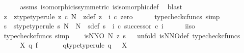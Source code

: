 \begin{isabellebody}
\ \ \ \ \isamarkupfalse%
\ assms\ isomorphic{\isacharunderscore}{\kern0pt}is{\isacharunderscore}{\kern0pt}symmetric\ is{\isacharunderscore}{\kern0pt}isomorphic{\isacharunderscore}{\kern0pt}def\ \isamarkupfalse%
\ blast\ \isanewline
\ \ \isamarkupfalse%
\ z\ \ z{\isacharunderscore}{\kern0pt}type{\isacharbrackleft}{\kern0pt}type{\isacharunderscore}{\kern0pt}rule{\isacharbrackright}{\kern0pt}{\isacharcolon}{\kern0pt}\ {\isachardoublequoteopen}z\ {\isasymin}\isactrlsub c\ N{\isachardoublequoteclose}\ \ z{\isacharunderscore}{\kern0pt}def{\isacharcolon}{\kern0pt}\ {\isachardoublequoteopen}z\ {\isacharequal}{\kern0pt}\ i\ {\isasymcirc}\isactrlsub c\ zero{\isachardoublequoteclose}\isanewline
\ \ \ \ \isamarkupfalse%
\ {\isacharparenleft}{\kern0pt}typecheck{\isacharunderscore}{\kern0pt}cfuncs{\isacharcomma}{\kern0pt}\ simp{\isacharparenright}{\kern0pt}\isanewline
\ \ \isamarkupfalse%
\ s\ \ s{\isacharunderscore}{\kern0pt}type{\isacharbrackleft}{\kern0pt}type{\isacharunderscore}{\kern0pt}rule{\isacharbrackright}{\kern0pt}{\isacharcolon}{\kern0pt}\ {\isachardoublequoteopen}s{\isacharcolon}{\kern0pt}\ N\ {\isasymrightarrow}\ N{\isachardoublequoteclose}\ \ s{\isacharunderscore}{\kern0pt}def{\isacharcolon}{\kern0pt}\ {\isachardoublequoteopen}s\ {\isacharequal}{\kern0pt}\ {\isacharparenleft}{\kern0pt}i\ {\isasymcirc}\isactrlsub c\ successor{\isacharparenright}{\kern0pt}\ {\isasymcirc}\isactrlsub c\ i\isactrlbold {\isasyminverse}{\isachardoublequoteclose}\isanewline
\ \ \ \ \isamarkupfalse%
\ i{\isacharunderscore}{\kern0pt}iso\ \isamarkupfalse%
\ {\isacharparenleft}{\kern0pt}typecheck{\isacharunderscore}{\kern0pt}cfuncs{\isacharcomma}{\kern0pt}\ simp{\isacharparenright}{\kern0pt}\isanewline
\ \ \isamarkupfalse%
\ {\isachardoublequoteopen}is{\isacharunderscore}{\kern0pt}NNO\ N\ z\ s{\isachardoublequoteclose}\isanewline
\ \ \isamarkupfalse%
{\isacharparenleft}{\kern0pt}unfold\ is{\isacharunderscore}{\kern0pt}NNO{\isacharunderscore}{\kern0pt}def{\isacharcomma}{\kern0pt}\ typecheck{\isacharunderscore}{\kern0pt}cfuncs{\isacharparenright}{\kern0pt}\isanewline
\ \ \ \ \isamarkupfalse%
\ X\ q\ f\ \isanewline
\ \ \ \ \isamarkupfalse%
\ q{\isacharunderscore}{\kern0pt}type{\isacharbrackleft}{\kern0pt}type{\isacharunderscore}{\kern0pt}rule{\isacharbrackright}{\kern0pt}{\isacharcolon}{\kern0pt}\ {\isachardoublequoteopen}q{\isacharcolon}{\kern0pt}\ {\isasymone}\ {\isasymrightarrow}\ X{\isachardoublequoteclose}\isanewline

\end{isabellebody}
